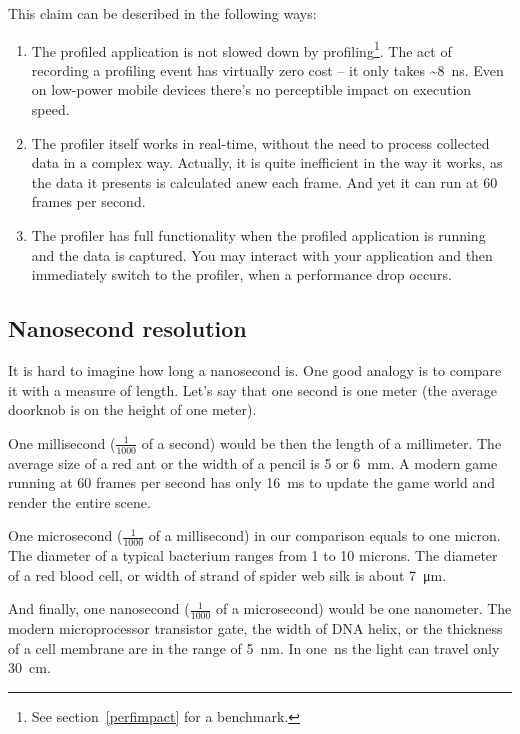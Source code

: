 \documentclass[hidelinks,titlepage,a4paper]{article}
\begin{document}
This claim can be described in the following ways:

\begin{enumerate}
\item The profiled application is not slowed down by profiling\footnote{See section~\ref{perfimpact} for a benchmark.}. The act of recording a profiling event has virtually zero cost -- it only takes \textasciitilde 8~\si{\nano\second}. Even on low-power mobile devices there's no perceptible impact on execution speed.
\item The profiler itself works in real-time, without the need to process collected data in a complex way. Actually, it is quite inefficient in the way it works, as the data it presents is calculated anew each frame. And yet it can run at 60 frames per second.
\item The profiler has full functionality when the profiled application is running and the data is captured. You may interact with your application and then immediately switch to the profiler, when a performance drop occurs.
\end{enumerate}

\subsection{Nanosecond resolution}

It is hard to imagine how long a nanosecond is. One good analogy is to compare it with a measure of length. Let's say that one second is one meter (the average doorknob is on the height of one meter).

One millisecond ($\frac{1}{1000}$ of a second) would be then the length of a millimeter. The average size of a red ant or the width of a pencil is 5 or 6~\si{\milli\metre}. A modern game running at 60 frames per second has only 16~\si{\milli\second} to update the game world and render the entire scene.

One microsecond ($\frac{1}{1000}$ of a millisecond) in our comparison equals to one micron. The diameter of a typical bacterium ranges from 1 to 10 microns. The diameter of a red blood cell, or width of strand of spider web silk is about 7~\si{\micro\metre}.

And finally, one nanosecond ($\frac{1}{1000}$ of a microsecond) would be one nanometer. The modern microprocessor transistor gate, the width of DNA helix, or the thickness of a cell membrane are in the range of 5~\si{\nano\metre}. In one~\si{\nano\second} the light can travel only 30~\si{\centi\meter}.
\end{document}
